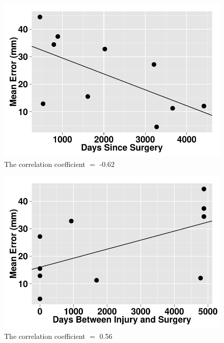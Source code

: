 \documentclass{article}
\begin{document}


\begin{figure}
\hspace{-4.5cm}
\includegraphics[width=1.7\linewidth]{timesince.pdf}
\caption{The correlation coefficient $=$ -0.62}
\end{figure}

\begin{figure}
\hspace{-4.5cm}
\includegraphics[width=1.7\linewidth]{timebetween.pdf}
\caption{The correlation coefficient $=$ 0.56}
\end{figure}
\end{document}
